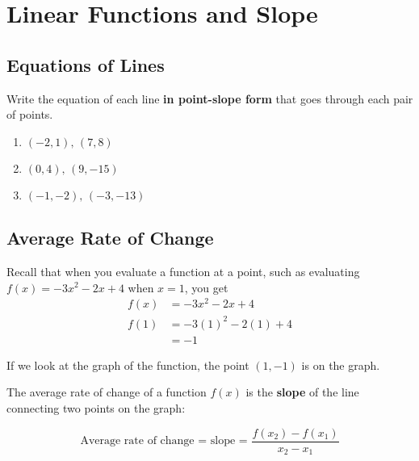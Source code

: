 \chapter{Linear Functions and Slope}

\section{Equations of Lines}

Write the equation of each line \textbf{in point-slope form} that goes through each pair of points.
\begin{enumerate}
\item $(-2, 1), \, (7,8)$
\item $(0,4), \, (9,-15)$
\item $(-1,-2), \, (-3,-13)$
\end{enumerate}

\section{Average Rate of Change}

Recall that when you evaluate a function at a point, such as evaluating $f(x) = -3x^2 - 2x + 4$ when $x = 1$, you get
\begin{align*}
    f(x) &= -3x^2 - 2x + 4 \\
    f(1) &= -3(1)^2 - 2(1) + 4 \\
    &= -1
\end{align*}

If we look at the graph of the function, the point $(1, -1)$ is on the graph.

\begin{center}
\end{center}

The average rate of change of a function $f(x)$ is the \textbf{slope} of the line connecting two points on the graph:
\bigskip 

\[
\text{Average rate of change = slope = } \frac{f(x_2)-f(x_1)}{x_2-x_1}
\]

